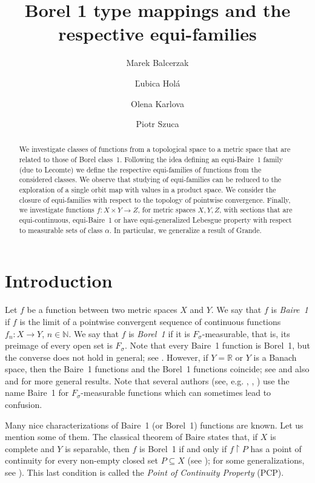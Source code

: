 \documentclass[a4paper]{amsart}
\author{Marek Balcerzak}
\author{\v{L}ubica Hol\'{a}}
\author{Olena Karlova}
\author{Piotr Szuca}
\title{Borel 1 type mappings and the respective equi-families}
\date{}
\theoremstyle{plain}
\theoremstyle{definition}
\theoremstyle{remark}
\numberwithin{equation}{section}
\newcommand{\N}{\mathbb N}
\newcommand{\R}{\mathbb R}
\begin{document}
\begin{abstract}
We investigate classes of functions from a topological space to a metric space
that are related to those of Borel class~1.
Following the idea defining an equi-Baire~1 family (due to Lecomte) we define the respective equi-families of functions from the considered classes. We observe that studying of equi-families can be reduced to the exploration of a single orbit map with values in a product space.
We consider the closure of equi-families  with respect to the topology of pointwise convergence. 
Finally, we investigate functions $f\colon X\times Y\to Z$, for metric spaces $X,Y,Z$, with sections that are equi-continuous, equi-Baire~1 or have equi-generalized Lebesgue property with respect to measurable sets of class $\alpha$. In particular, we generalize a result of Grande.
\end{abstract}
\maketitle


\section{Introduction}

Let $f$ be a function between two metric spaces $X$ and $Y$. We say that $f$ is \emph{Baire~1} if $f$ is the limit of a pointwise convergent sequence of continuous functions $f_n\colon X\to Y$, $n\in\N$. We say that $f$ is \emph{Borel~1} if it is $F_\sigma$-measurable, that is, its preimage of every open set is $F_\sigma$. Note that every Baire~1 function is Borel~1, but the converse does not hold in general; see \cite[24B]{Kech}.
However, if $Y=\R$ or $Y$ is a Banach space, then the Baire~1 functions and the Borel~1 functions coincide; see \cite{Kech} and also \cite{Fo} and \cite[Remark 5.6]{Sp} for 
more general results. Note that several authors (see, e.g. \cite{Kech}, \cite{Le}, \cite{LTZ}) use the name Baire~1 for $F_\sigma$-measurable functions which can sometimes lead to confusion. 

Many nice characterizations of Baire~1 (or Borel~1) functions are known. Let us mention some of them. The classical theorem of Baire states that, if $X$ is complete and $Y$ is separable, then $f$ is Borel~1 if and only if
$f\upharpoonright P$ has a point of continuity for every non-empty closed set $P\subseteq X$ (see \cite{Ku}); for some generalizations, see \cite{Kou}). This last condition is called the 
\emph{Point of Continuity Property} (PCP). 
\end{document}
